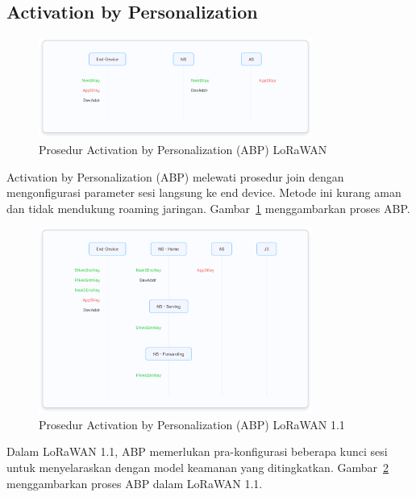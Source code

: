 \subsection{Activation by Personalization}
\begin{figure}
    \centering
    \includegraphics[width=0.8\textwidth]{figures/abp-1.0.png}
    \caption{Prosedur Activation by Personalization (ABP) LoRaWAN}
    \label{fig:lora_abp}
\end{figure}
Activation by Personalization (ABP) melewati prosedur join dengan mengonfigurasi parameter sesi langsung ke end device. Metode ini kurang aman dan tidak mendukung roaming jaringan.
Gambar~\ref{fig:lora_abp} menggambarkan proses ABP.
\begin{figure}
    \centering
    \includegraphics[width=0.8\textwidth]{figures/abp-1.1.png}
    \caption{Prosedur Activation by Personalization (ABP) LoRaWAN 1.1}
    \label{fig:lora_abp_1.1}
\end{figure}
Dalam LoRaWAN 1.1, ABP memerlukan pra-konfigurasi beberapa kunci sesi untuk menyelaraskan dengan model keamanan yang ditingkatkan.
Gambar~\ref{fig:lora_abp_1.1} menggambarkan proses ABP dalam LoRaWAN 1.1.
